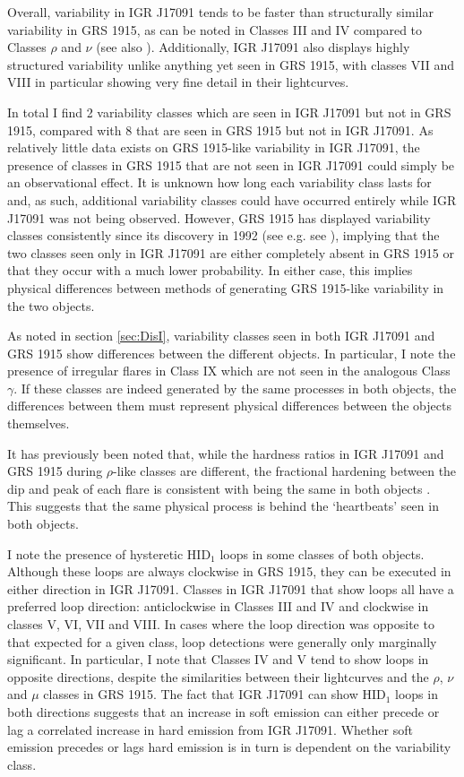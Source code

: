 \par Overall, variability in IGR J17091 tends to be faster than structurally similar variability in GRS 1915, as can be noted in Classes III and IV compared to Classes $\rho$ and $\nu$ (see also \citealp{Altamirano_IGR_FH}).  Additionally, IGR J17091 also displays highly structured variability unlike anything yet seen in GRS 1915, with classes VII and VIII in particular showing very fine detail in their lightcurves.
\par In total I find 2 variability classes which are seen in IGR J17091 but not in GRS 1915, compared with 8 that are seen in GRS 1915 but not in IGR J17091.  As relatively little data exists on GRS 1915-like variability in IGR J17091, the presence of classes in GRS 1915 that are not seen in IGR J17091 could simply be an observational effect.  It is unknown how long each variability class lasts for and, as such, additional variability classes could have occurred entirely while IGR J17091 was not being observed.  However, GRS 1915 has displayed variability classes consistently since its discovery in 1992 (see e.g. see \citealp{Huppenkothen_ML}), implying that the two classes seen only in IGR J17091 are either completely absent in GRS 1915 or that they occur with a much lower probability.  In either case, this implies physical differences between methods of generating GRS 1915-like variability in the two objects.  
\par As noted in section \ref{sec:DisI}, variability classes seen in both IGR J17091 and GRS 1915 show differences between the different objects.  In particular, I note the presence of irregular flares in Class IX which are not seen in the analogous Class $\gamma$.  If these classes are indeed generated by the same processes in both objects, the differences between them must represent physical differences between the objects themselves.
\par It has previously been noted that, while the hardness ratios in IGR J17091 and GRS 1915 during $\rho$-like classes are different, the fractional hardening between the dip and peak of each flare is consistent with being the same in both objects \citep{Capitanio_peculiar}.  This suggests that the same physical process is behind the `heartbeats' seen in both objects.
\par I note the presence of hysteretic HID$_1$ loops in some classes of both objects.  Although these loops are always clockwise in GRS 1915, they can be executed in either direction in IGR J17091.  Classes in IGR J17091 that show loops all have a preferred loop direction: anticlockwise in Classes III and IV and clockwise in classes V, VI, VII and VIII.  In cases where the loop direction was opposite to that expected for a given class, loop detections were generally only marginally significant.  In particular, I note that Classes IV and V tend to show loops in opposite directions, despite the similarities between their lightcurves and the $\rho$, $\nu$ and $\mu$ classes in GRS 1915.   The fact that IGR J17091 can show HID$_1$ loops in both directions suggests that an increase in soft emission can either precede or lag a correlated increase in hard emission from IGR J17091.  Whether soft emission precedes or lags hard emission is in turn is dependent on the variability class.
